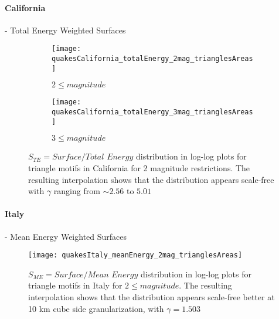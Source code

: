 \clearpage
\paragraph{California} - Total Energy Weighted Surfaces
\begin{figure}[h!]

\begin{subfigure}{.99\textwidth}
  \centering
  \texttt{[image: quakesCalifornia\_totalEnergy\_2mag\_trianglesAreas]}
  \caption{$2 \leq magnitude$}
  \label{fig:trianglesCaTE2}
\end{subfigure}%

\begin{subfigure}{.99\textwidth}
  \centering
  \texttt{[image: quakesCalifornia\_totalEnergy\_3mag\_trianglesAreas]}
  \caption{$3 \leq magnitude$}
  \label{fig:trianglesCaTe3}
\end{subfigure}%

\caption{$S_{TE} = Surface/Total$ $Energy$ distribution in log-log plots for triangle motifs in California for 2 magnitude restrictions. The resulting interpolation shows that the distribution appears scale-free with $\gamma$ ranging from $\sim 2.56$ to $5.01$ }
\label{fig:trianglesSurfacesCaTE}
\end{figure}


\clearpage
\paragraph{Italy} - Mean Energy Weighted Surfaces
\begin{figure}[h!]

  \centering
  \texttt{[image: quakesItaly\_meanEnergy\_2mag\_trianglesAreas]}
  \caption{$2 \leq magnitude$}
  \label{fig:trianglesItME2}


\caption{$S_{ME} = Surface/Mean$ $Energy$ distribution in log-log plots for triangle motifs in Italy for $2 \leq magnitude$. The resulting interpolation shows that the distribution appears scale-free better at 10 km cube side granularization, with $\gamma = 1.503$ }
\label{fig:trianglesSurfacesItME}
\end{figure}


